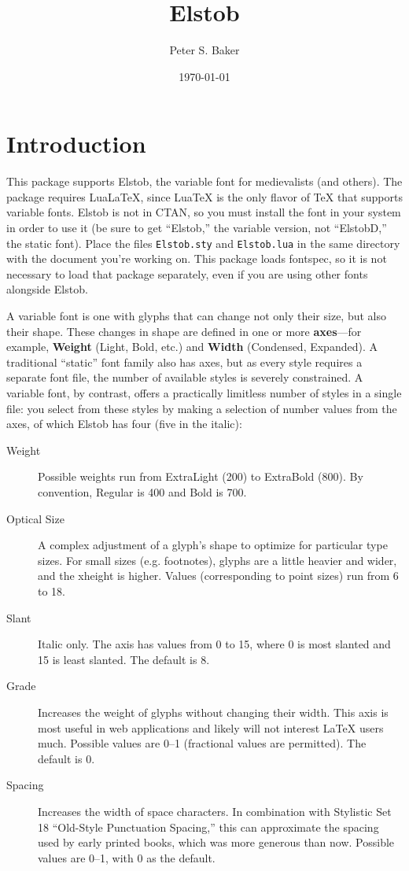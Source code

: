 \documentclass[12pt]{article}
\title{Elstob}
\author{Peter S. Baker}
\date{\today}
\newcommand{\ltech}{Lua\kern-1.5pt\TeX}
\newcommand{\lltech}{Lua\LaTeX}
\newcommand{\fspec}{{\sffamily fontspec}}
\newcommand{\src}[1]{{\color{BrickRed}\texttt{#1}}}
\begin{document}
\maketitle

\section{Introduction}

This package supports Elstob, the variable font for medievalists (and others).
The package requires \lltech, since {\ltech} is
the only flavor of {\TeX} that supports variable fonts. Elstob is not in CTAN, so you must
install the font in your system in order to use it (be sure to get “Elstob,” the variable
version, not “ElstobD,” the static font). Place the files \src{Elstob.sty} and
\src{Elstob.lua} in the same
directory with the document you're working on. This package loads
\fspec, so it is not necessary to load that package separately, even if you are using
other fonts alongside Elstob.

A variable font is one with glyphs that can change not only their size, but also their
shape. These changes in shape are defined in one or more \textbf{axes}---for example,
\textbf{Weight} (Light, Bold, etc.) and \textbf{Width} (Condensed, Expanded). A traditional
“static” font family also has axes, but as every style requires a separate font file,
the number of available styles is severely constrained. A variable font, by contrast,
offers a practically limitless number of styles in a single file: you select from these styles
by making a selection of number values from the axes, of which Elstob has four (five in the italic):

\begin{description}
    \item[Weight] Possible weights run from ExtraLight (200) to ExtraBold (800). By
    convention, Regular is 400 and Bold is 700.
    \item[Optical Size] A complex adjustment of a glyph's shape to
    optimize for particular type sizes. For small sizes (e.g. footnotes), glyphs are
    a little heavier and wider, and the xheight is higher. Values (corresponding to
    point sizes) run from 6 to 18.
    \item[Slant] Italic only. The axis has values from 0 to 15, where 0 is {\mostslanted most
    slanted} and 15 is {\leastslanted least slanted}. The default is 8.
    \item[Grade] Increases the weight of glyphs without changing their width. This
    axis is most useful in web applications and likely will not interest {\LaTeX} users
    much. Possible values are 0–1 (fractional values are permitted). The default is 0.
    \item[Spacing] Increases the width of space characters. In combination with
    Stylistic Set 18 “Old-Style Punctuation Spacing,” this can approximate the
    spacing used by early printed books, which was more generous than now.
    Possible values are 0–1, with 0 as the default.
\end{description}
\end{document}
